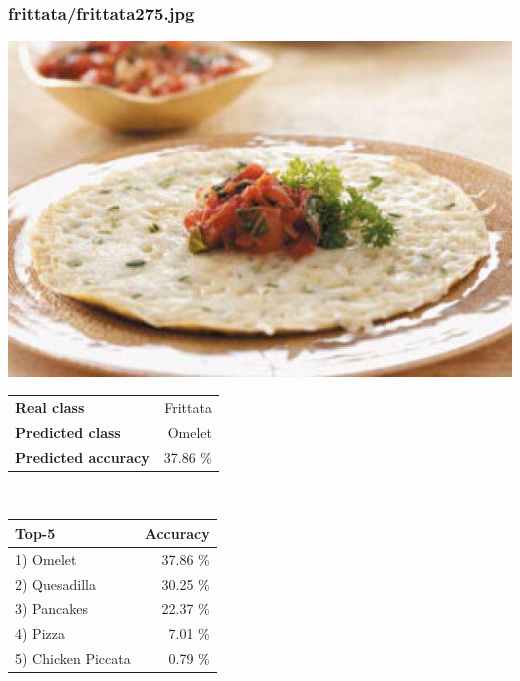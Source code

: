 \subsubsection{frittata/frittata275.jpg}

\begin{minipage}[t]{0.4\textwidth}
	\vspace{0pt}
	\includegraphics[width=\linewidth]{images/evaluation-images/frittata/frittata275.jpg}
\end{minipage}
\hfill
\begin{minipage}[t]{0.5\textwidth}
	\vspace{0pt}\raggedright
	\begin{tabularx}{\textwidth}{X r}
		\small \textbf{Real class} & \small Frittata\\
		\small \textbf{Predicted class} & \small Omelet\\
		\small \textbf{Predicted accuracy} & \small 37.86 \%
    \end{tabularx}\\
    
    \vspace{6pt}
	\begin{tabularx}{\textwidth}{X r}
        \small \textbf{Top-5} & \small \textbf{Accuracy} \\
        \hline
		\small 1) Omelet & \small 37.86 \%\\\small 2) Quesadilla & \small 30.25 \%\\\small 3) Pancakes & \small 22.37 \%\\\small 4) Pizza & \small 7.01 \%\\\small 5) Chicken Piccata & \small 0.79 \%
    \end{tabularx}
\end{minipage}
    
